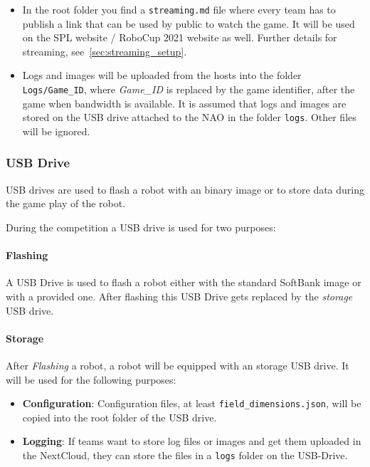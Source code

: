\begin{itemize}
    \item In the root folder you find a \texttt{streaming.md} file where every team has to publish a link that can be used by public to watch the game. It will be used on the SPL website / RoboCup 2021 website as well. Further details for streaming, see~\ref{sec:streaming_setup}.
	\item Logs and images will be uploaded from the hosts into the folder \texttt{Logs/Game\_ID}, where \textit{Game\_ID} is replaced by the game identifier, after the game when bandwidth is available. It is assumed that logs and images are stored on the USB drive attached to the NAO in the folder \texttt{logs}. Other files will be ignored. 

\end{itemize}

\subsubsection{USB Drive}
\label{sec:c3_USB_Drive}
USB drives are used to flash a robot with an binary image or to store data during the game play of the robot.

During the competition a USB drive is used for two purposes:

\paragraph*{Flashing}
A USB Drive is used to flash a robot either with the standard SoftBank image or with a provided one. After flashing this USB Drive gets replaced by the \textit{storage} USB drive.

\paragraph*{Storage}
After \textit{Flashing} a robot, a robot will be equipped with an storage USB drive. It will be used for the following purposes:

\begin{itemize}
	\item \textbf{Configuration}: Configuration files, at least \texttt{field\_dimensions.json}, will be copied into the root folder of the USB drive. 
	\item  \textbf{Logging}: If teams want to store log files or images and get them uploaded in the NextCloud, they can store the files in a \texttt{logs} folder on the USB-Drive. 
\end{itemize}

